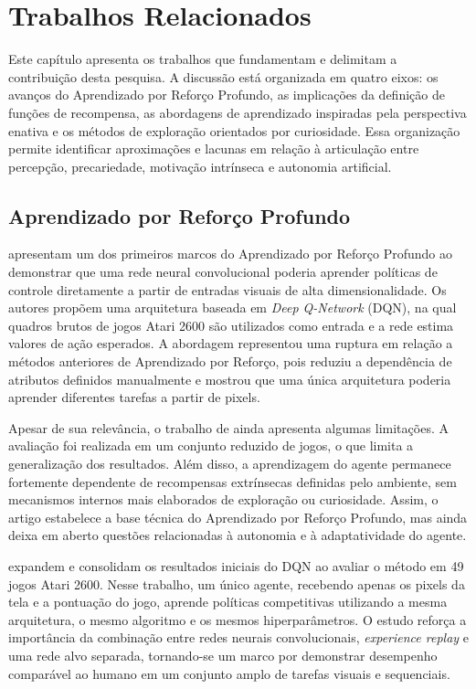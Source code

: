 \chapter{Trabalhos Relacionados}
\label{cap:trabalhos-relacionados}

Este capítulo apresenta os trabalhos que fundamentam e delimitam a contribuição desta pesquisa. A discussão está organizada em quatro eixos: os avanços do Aprendizado por Reforço Profundo, as implicações da definição de funções de recompensa, as abordagens de aprendizado inspiradas pela perspectiva enativa e os métodos de exploração orientados por curiosidade. Essa organização permite identificar aproximações e lacunas em relação à articulação entre percepção, precariedade, motivação intrínseca e autonomia artificial.

\section{Aprendizado por Reforço Profundo}

 apresentam um dos primeiros marcos do Aprendizado por Reforço Profundo ao demonstrar que uma rede neural convolucional poderia aprender políticas de controle diretamente a partir de entradas visuais de alta dimensionalidade. Os autores propõem uma arquitetura baseada em \textit{Deep Q-Network} (DQN), na qual quadros brutos de jogos Atari 2600 são utilizados como entrada e a rede estima valores de ação esperados. A abordagem representou uma ruptura em relação a métodos anteriores de Aprendizado por Reforço, pois reduziu a dependência de atributos definidos manualmente e mostrou que uma única arquitetura poderia aprender diferentes tarefas a partir de pixels.

Apesar de sua relevância, o trabalho de  ainda apresenta algumas limitações. A avaliação foi realizada em um conjunto reduzido de jogos, o que limita a generalização dos resultados. Além disso, a aprendizagem do agente permanece fortemente dependente de recompensas extrínsecas definidas pelo ambiente, sem mecanismos internos mais elaborados de exploração ou curiosidade. Assim, o artigo estabelece a base técnica do Aprendizado por Reforço Profundo, mas ainda deixa em aberto questões relacionadas à autonomia e à adaptatividade do agente.

 expandem e consolidam os resultados iniciais do DQN ao avaliar o método em 49 jogos Atari 2600. Nesse trabalho, um único agente, recebendo apenas os pixels da tela e a pontuação do jogo, aprende políticas competitivas utilizando a mesma arquitetura, o mesmo algoritmo e os mesmos hiperparâmetros. O estudo reforça a importância da combinação entre redes neurais convolucionais, \textit{experience replay} e uma rede alvo separada, tornando-se um marco por demonstrar desempenho comparável ao humano em um conjunto amplo de tarefas visuais e sequenciais.

